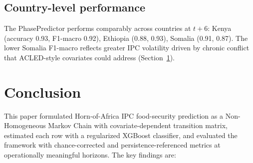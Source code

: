 \documentclass[11pt,letterpaper]{article}
\begin{document}
\subsection{Country-level performance}

The PhasePredictor performs comparably across countries at $t\!+\!6$: Kenya (accuracy 0.93, F1-macro 0.92), Ethiopia (0.88, 0.93), Somalia (0.91, 0.87). The lower Somalia F1-macro reflects greater IPC volatility driven by chronic conflict that ACLED-style covariates could address (Section~\ref{sec:conclusion}).


\section{Conclusion}\label{sec:conclusion}

This paper formulated Horn-of-Africa IPC food-security prediction as a Non-Homogeneous Markov Chain with covariate-dependent transition matrix, estimated each row with a regularized XGBoost classifier, and evaluated the framework with chance-corrected and persistence-referenced metrics at operationally meaningful horizons. The key findings are:
\end{document}
